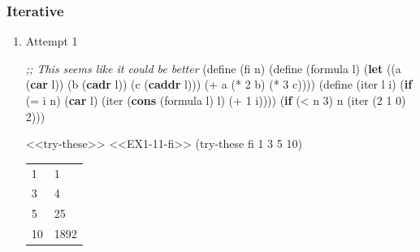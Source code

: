 \documentclass[
]{article}
\newenvironment{Shaded}{}{}
\newcommand{\CommentTok}[1]{\textcolor[rgb]{0.38,0.63,0.69}{\textit{#1}}}
\newcommand{\DecValTok}[1]{\textcolor[rgb]{0.25,0.63,0.44}{#1}}
\newcommand{\ExtensionTok}[1]{#1}
\newcommand{\FunctionTok}[1]{\textcolor[rgb]{0.02,0.16,0.49}{#1}}
\newcommand{\KeywordTok}[1]{\textcolor[rgb]{0.00,0.44,0.13}{\textbf{#1}}}
\newcommand{\NormalTok}[1]{#1}
\newcommand{\OperatorTok}[1]{\textcolor[rgb]{0.40,0.40,0.40}{#1}}
\begin{document}
\hypertarget{iterative}{%
\subsubsection{Iterative}\label{iterative}}

\begin{enumerate}
\item
  Attempt 1

\hypertarget{EX1-11-fi}{%
\label{EX1-11-fi}}%
\begin{Shaded}
\begin{Highlighting}[numbers=left,,]
\CommentTok{;; This seems like it could be better}
\NormalTok{(}\ExtensionTok{define}\FunctionTok{ }\NormalTok{(fi n)}
\NormalTok{  (}\ExtensionTok{define}\FunctionTok{ }\NormalTok{(formula l)}
\NormalTok{    (}\KeywordTok{let}\NormalTok{ ((a (}\KeywordTok{car}\NormalTok{ l))}
\NormalTok{           (b (}\KeywordTok{cadr}\NormalTok{ l))}
\NormalTok{           (c (}\KeywordTok{caddr}\NormalTok{ l)))}
\NormalTok{      (}\OperatorTok{+}\NormalTok{ a}
\NormalTok{         (}\OperatorTok{*} \DecValTok{2}\NormalTok{ b)}
\NormalTok{         (}\OperatorTok{*} \DecValTok{3}\NormalTok{ c))))}
\NormalTok{  (}\ExtensionTok{define}\FunctionTok{ }\NormalTok{(iter l i)}
\NormalTok{    (}\KeywordTok{if}\NormalTok{ (}\OperatorTok{=}\NormalTok{ i n)}
\NormalTok{        (}\KeywordTok{car}\NormalTok{ l)}
\NormalTok{        (iter (}\KeywordTok{cons}\NormalTok{ (formula l) l)}
\NormalTok{              (}\OperatorTok{+} \DecValTok{1}\NormalTok{ i))))}
\NormalTok{  (}\KeywordTok{if}\NormalTok{ (}\OperatorTok{\textless{}}\NormalTok{ n }\DecValTok{3}\NormalTok{)}
\NormalTok{      n}
\NormalTok{      (iter \textquotesingle{}(}\DecValTok{2} \DecValTok{1} \DecValTok{0}\NormalTok{) }\DecValTok{2}\NormalTok{)))}
\end{Highlighting}
\end{Shaded}

\begin{Shaded}
\begin{Highlighting}[numbers=left,,]
\NormalTok{\textless{}\textless{}try{-}these\textgreater{}\textgreater{}}
\NormalTok{\textless{}\textless{}EX1{-}11{-}fi\textgreater{}\textgreater{}}
\NormalTok{(try{-}these fi }\DecValTok{1} \DecValTok{3} \DecValTok{5} \DecValTok{10}\NormalTok{)}
\end{Highlighting}
\end{Shaded}

  \begin{longtable}[]{@{}ll@{}}
  \toprule
  \endhead
  1 & 1 \\
  3 & 4 \\
  5 & 25 \\
  10 & 1892 \\
  \bottomrule
  \end{longtable}


\end{enumerate}
\end{document}

